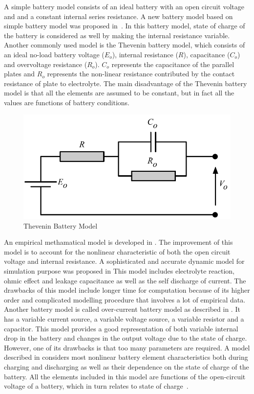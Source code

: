A simple battery model consists of an ideal battery with an open circuit voltage and and a constant internal series resistance. A new battery model based on simple battery model was proposed in~\cite{ZS_jean}. In this battery model, state of charge of the battery is considered as well by making the internal resistance variable. Another commonly used model is the Thevenin battery
model, which consists of an ideal no-load battery voltage ($E_o$),
internal resistance ($R$), capacitance ($C_o$) and overvoltage
resistance ($R_o$). $C_o$ represents the capacitance of the parallel
plates and $R_o$ represents the non-linear resistance contributed
by the contact resistance of plate to electrolyte. The main disadvantage of the Thevenin battery model is that
all the elements are assumed to be constant, but in fact all the
values are functions of battery conditions.


\begin{figure}[b]
\centering
\includegraphics[scale=0.5]{Figures/Zili_Shao/ZS_figure1.pdf}
\caption{Thevenin Battery Model}

\end{figure}

An empirical methamatical model is developed in \cite{ZS_jayne,ZS_sims}. The improvement of this model is to account for the nonlinear
characteristic of both the open circuit voltage and
internal resistance. A sophisticated and accurate dynamic model for simulation purpose was proposed in \cite{ZS_gig} This model includes electrolyte reaction, ohmic effect and leakage capacitance as well as the self discharge of current. The drawbacks of this model include longer time for computation because of its higher order and complicated modelling procedure that involves a lot of empirical data. Another battery model is called over-current battery model as described in \cite{ZS_rob}. It has a variable
current source, a variable voltage source, a variable resistor
and a capacitor. This model provides a good representation of both variable
internal drop in the battery and changes in the output voltage
due to the state of charge. However, one of its drawbacks is
that too many parameters are required. A model described in \cite{ZS_zi,ZS_mar}
considers most nonlinear battery element characteristics both during charging and 
discharging as well as their dependence on the state of charge
of the battery. All the elements included in this model are functions of the
open-circuit voltage of a battery, which in turn relates to state of
charge~\cite{ZS_chan}.


